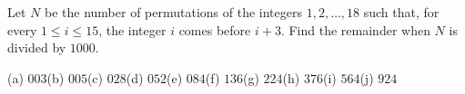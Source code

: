 Let $N$ be the number of permutations of the integers $1,2,\dots,18$ such that, for every $1\le i\le15$, the integer $i$ comes before $i+3$. Find the remainder when $N$ is divided by $1000$.

(a) $003$\quad (b) $005$\quad (c) $028$\quad (d) $052$\quad (e) $084$\quad (f) $136$\quad (g) $224$\quad (h) $376$\quad (i) $564$\quad (j) $924$
